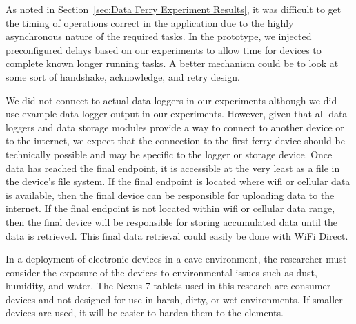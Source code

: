 \documentclass[10pt,twocolumn]{article}
\begin{document}


As noted in Section~\ref{sec:Data Ferry Experiment Results}, it was difficult to get the timing of operations correct in the application due to the highly asynchronous nature of the required tasks.
In the prototype, we injected preconfigured delays based on our experiments to allow time for devices to complete known longer running tasks.
A better mechanism could be to look at some sort of handshake, acknowledge, and retry design.

We did not connect to actual data loggers in our experiments although we did use example data logger output in our experiments.
However, given that all data loggers and data storage modules provide a way to connect to another device or to the internet, 
we expect that the connection to the first ferry device should be technically possible and may be specific to the logger or storage device.
Once data has reached the final endpoint, it is accessible at the very least as a file in the device's file system.
If the final endpoint is located where wifi or cellular data is available, 
then the final device can be responsible for uploading data to the internet.
If the final endpoint is not located within wifi or cellular data range, 
then the final device will be responsible for storing accumulated data until the data is retrieved.
This final data retrieval could easily be done with WiFi Direct.

In a deployment of electronic devices in a cave environment, the researcher must consider the exposure of the devices to environmental issues such as dust, humidity, and water.
The Nexus 7 tablets used in this research are consumer devices and not designed for use in harsh, dirty, or wet environments.
If smaller devices are used, it will be easier to harden them to the elements.
\end{document}
